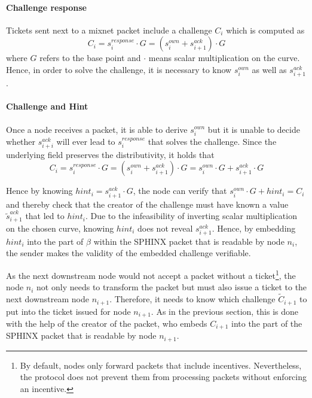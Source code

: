 \paragraph{Challenge response}

Tickets sent next to a mixnet packet include a challenge $C_i$ which is computed as $$C_i = s_i^{response} \cdot G = (s_i^{own} + s_{i+1}^{ack}) \cdot G$$ where $G$ refers to the base point and $\cdot$ means scalar multiplication on the curve. Hence, in order to solve the challenge, it is necessary to know $s_i^{own}$ as well as $s_{i+1}^{ack}$.

\paragraph{Challenge and Hint}
\label{sec:incentives:proofofrelay:challenge}

Once a node receives a packet, it is able to derive $s_i^{own}$ but it is unable to decide whether $s_{i+i}^{ack}$ will ever lead to $s_i^{response}$ that solves the challenge. Since the underlying field preserves the distributivity, it holds that $$C_i = s_i^{response} \cdot G = (s_i^{own} + s_{i+1}^{ack}) \cdot G = s_i^{own} \cdot G + s_{i+1}^{ack} \cdot G$$

Hence by knowing $hint_i = s_{i+1}^{ack} \cdot G$, the node can verify that $s_i^{own} \cdot G + hint_i = C_i$ and thereby check that the creator of the challenge must have known a value $\tilde{s}_{i+1}^{ack}$ that led to $hint_i$. Due to the infeasibility of inverting scalar multiplication on the chosen curve, knowing $hint_i$ does not reveal $s_{i+1}^{ack}$. Hence, by embedding $hint_i$ into the part of $\beta$ within the SPHINX packet that is readable by node $n_i$, the sender makes the validity of the embedded challenge verifiable.

As the next downstream node would not accept a packet without a ticket\footnote{By default, nodes only forward packets that include incentives. Nevertheless, the protocol does not prevent them from processing packets without enforcing an incentive.}, the node $n_i$ not only needs to transform the packet but must also issue a ticket to the next downstream node $n_{i+1}$. Therefore, it needs to know which challenge $\tilde{C}_{i+1}$ to put into the ticket issued for node $n_{i+1}$. As in the previous section, this is done with the help of the creator of the packet, who embeds $C_{i+1}$ into the part of the SPHINX packet that is readable by node $n_{i+1}$.

